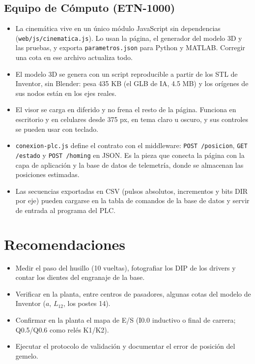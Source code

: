 \documentclass[a4paper,12pt]{article}
\newcommand{\codigo}[1]{\texttt{\small #1}}
\begin{document}
\subsection{Equipo de Cómputo (ETN-1000)}
\begin{itemize}
\item La cinemática vive en un único módulo JavaScript sin dependencias (\codigo{web/js/cinematica.js}).
      Lo usan la página, el generador del modelo 3D y las pruebas, y exporta \codigo{parametros.json}
      para Python y MATLAB. Corregir una cota en ese archivo actualiza todo.
\item El modelo 3D se genera con un script reproducible a partir de los STL de Inventor, sin Blender: pesa
      435 KB (el GLB de IA, 4.5 MB) y los orígenes de sus nodos están en los ejes reales.
\item El visor se carga en diferido y no frena el resto de la página. Funciona en escritorio y en
      celulares desde 375 px, en tema claro u oscuro, y sus controles se pueden usar con teclado.
\item \codigo{conexion-plc.js} define el contrato con el middleware: \codigo{POST /posicion},
      \codigo{GET /estado} y \codigo{POST /homing} en JSON. Es la pieza que conecta la página con la capa
      de aplicación y la base de datos de telemetría, donde se almacenan las posiciones estimadas.
\item Las secuencias exportadas en CSV (pulsos absolutos, incrementos y bits DIR por eje) pueden cargarse
      en la tabla de comandos de la base de datos y servir de entrada al programa del PLC.
\end{itemize}

\section{Recomendaciones}
\begin{itemize}
\item Medir el paso del husillo (10 vueltas), fotografiar los DIP de los drivers y contar los dientes del
      engranaje de la base.
\item Verificar en la planta, entre centros de pasadores, algunas cotas del modelo de Inventor ($a$, $L_{12}$, los postes 14).
\item Confirmar en la planta el mapa de E/S (I0.0 inductivo o final de carrera; Q0.5/Q0.6 como relés K1/K2).
\item Ejecutar el protocolo de validación y documentar el error de posición del gemelo.
\end{itemize}
\end{document}
